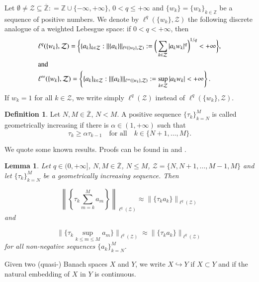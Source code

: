 \documentclass[12pt]{amsart}
\theoremstyle{plain}
\newtheorem{lem}[thm]{Lemma}
\theoremstyle{definition}
\newtheorem{defi}[thm]{Definition}
\numberwithin{thm}{section}
\numberwithin{equation}{section}
\begin{document}
Let $\emptyset \neq {\mathcal Z} \subseteq \overline{\mathbb Z} : = {\mathbb Z} \cup \{
-\infty ,+\infty\}$, $0 < q \le +\infty$ and $\{w_k\} = \{w_k\}_{k \in
	{\mathbb Z}}$ be a sequence of positive numbers. We denote by
$\ell^q(\{w_k\},{\mathcal Z})$ the following discrete analogue of a weighted
Lebesgue space: if $0 < q < + \infty$, then
\begin{align*}
&\ell^q(\{w_k\},{\mathcal Z}) = \bigg\{ \{a_k\}_{k \in {\mathcal Z}}:
\|\{a_k\}\|_{\ell^q(\{w_k\},{\mathcal Z})}
: = \bigg(\sum_{k\in{\mathcal Z}}|a_k w_k|^q\bigg)^{1 / q}<+\infty \bigg\},\\
\intertext{and} &
\ell^\infty(\{w_k\},{\mathcal Z}) =\left\{ \{a_k\}_{k\in{\mathcal Z}}:
\|\{a_k\}\|_{\ell^\infty(\{w_k\},{\mathcal Z})} : =
\sup_{k\in{\mathcal Z}}|a_kw_k|<+\infty \right\}.
\end{align*}
If $w_k=1$ for all $k \in {\mathcal Z}$, we write simply $\ell^q({\mathcal Z})$ instead
of $\ell^q(\{w_k\},{\mathcal Z})$. 

\begin{defi} \label{D:2.1}
	Let $N,M\in \overline{\mathbb Z}$, $N<M$. A positive sequence $\{\tau _k\} _{k=N}^M$ is called geometrically increasing if
	there is $\alpha \in (1, +\infty )$ such that
	$$
	\tau _k\geq \alpha \tau _{k-1} \quad \text{for all} \quad k\in
	\{ N+1, \dots ,M\}.
	$$
\end{defi}

We quote some known results. Proofs  can be found in \cite{Le1} and
\cite{Le2}.
\begin{lem}\label{L:1.2}
	Let $q\in (0,+\infty ]$, $N, M \in \overline{\mathbb Z}$, $ N\le M$, ${\mathcal Z} =
	\{N,N+1,\ldots,M-1,M\}$ and let $\{ \tau_k\} _{k=N}^M$ be a	geometrically increasing sequence. Then
	
	\begin{equation}\label{E1.1.1}
	\left\| \left\{\tau _k \sum_{m=k}^{M}a_m\right\}\right\|
	_{\ell^q({\mathcal Z})} \approx \| \{\tau _ka_k\}\| _{\ell^q({\mathcal Z})}
	\end{equation}
	and
	
	\begin{equation}\label{E1.2.1}
	\bigg\| \bigg\{\tau _k \sup _{k\leq m\leq M}a_m \bigg\}\bigg\|
	_{\ell^q({\mathcal Z})} \approx \|\{\tau _ka_k\}\| _{\ell^q({\mathcal Z})}
	\end{equation}
	for all non-negative sequences $\{ a_k\} _{k=N}^M$.
\end{lem}

Given two (quasi-) Banach spaces $X$ and $Y$, we write $X
\hookrightarrow Y$ if $X \subset Y$ and if the natural embedding of
$X$ in $Y$ is continuous.
\end{document}
